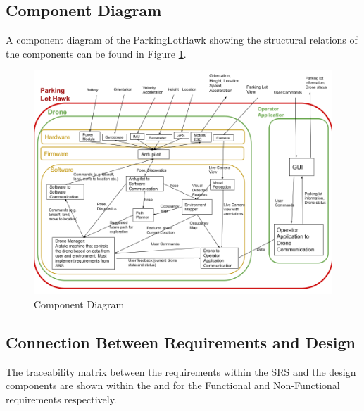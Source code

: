 \documentclass[12pt, titlepage]{article}
\begin{document}
\clearpage

\subsection{Component Diagram}

A component diagram of the ParkingLotHawk showing the structural relations of the components can be found in Figure \ref{ComponentDiagram}.

\begin{figure}[h!]
  \begin{center} 
  \caption{Component Diagram}
  \label{ComponentDiagram}
        \includegraphics[width=1\textwidth]{ComponentDiagram.png}
  \end{center}
\end{figure}

\subsection{Connection Between Requirements and Design} \label{SecConnection}

The traceability matrix between the requirements within the SRS and the design components are shown within the  and  for the Functional and Non-Functional requirements respectively.
\end{document}
